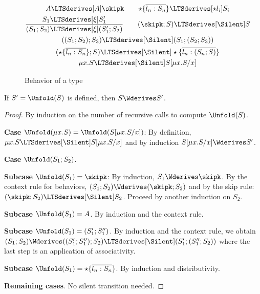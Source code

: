 \begin{figure}[tp]
  \begin{gather*}
    {A \LTSderives[A] \skipk }
    \qquad
    {\star\{\overline{l_n:S_n}\} \LTSderives[\star l_i] S_i}
    \\
    \frac{S_1 \LTSderives[\xi] S_1'}{(S_1; S_2) \LTSderives[\xi]
      (S_1';S_2) }
    \qquad
    {(\skipk; S) \LTSderives[\Silent] S}
    \\
    {((S_1;S_2); S_3) \LTSderives[\Silent] (S_1; (S_2; S_3))}
    \\
    {(\star\{\overline{l_n:S_n}\}; S) \LTSderives[\Silent]
      \star\{\overline{l_n:(S_n; S)}\}}
    \\
    { \mu x.S \LTSderives[\Silent] S[\mu x.S/x]}
  \end{gather*}
  \caption{Behavior of a type}
  \label{fig:type-behavior}
\end{figure}
\begin{lemma}\label{lemma:app:unfold-silent}
  If $S' = \Unfold (S)$ is defined, then $S \Wderives S'$.
\end{lemma}
\begin{proof}
  By induction on the number of recursive calls to compute $\Unfold
  (S)$.

  \textbf{Case }$\Unfold (\mu x.S) = \Unfold (S[\mu x.S/x])$: By
  definition, $\mu x.S \LTSderives[\Silent] S[\mu x.S/x] $ and by
  induction $S[\mu x.S/x] \Wderives S'$.

  \textbf{Case }$\Unfold (S_1;S_2)$.

  \textbf{Subcase }$\Unfold (S_1) = \skipk$: By induction, $S_1
  \Wderives \skipk$. By the context rule for behaviors,
  $(S_1; S_2) \Wderives (\skipk; S_2 )$ and by the skip
  rule: $(\skipk; S_2 ) \LTSderives[\Silent] S_2$. Proceed by another
  induction on $S_2$.

  \textbf{Subcase }$\Unfold (S_1) = A$. By induction and the context
  rule.

  \textbf{Subcase }$\Unfold (S_1) = (S_1'; S_1'')$. By induction and
  the context rule, we obtain $(S_1;S_2) \Wderives
  ((S_1'; S_1''); S_2) \LTSderives[\Silent] (S_1'; (S_1''; S_2))$
  where the last step is an application of associativity.

  \textbf{Subcase }$\Unfold (S_1) = \star\{\overline{l_n:S_n} \}$. By
  induction and distributivity.

  \textbf{Remaining cases}. No silent transition needed.
\end{proof}

